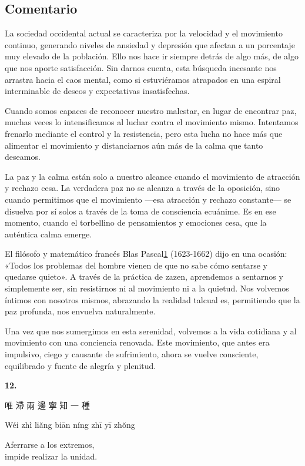 \documentclass[
  a5paperpaper,
]{article}
\begin{document}
\hfill\break

\hypertarget{comentario-10}{%
\subsection{Comentario}\label{comentario-10}}

La sociedad occidental actual se caracteriza por la velocidad y el
movimiento continuo, generando niveles de ansiedad y depresión que
afectan a un porcentaje muy elevado de la población. Ello nos hace ir
siempre detrás de algo más, de algo que nos aporte satisfacción. Sin
darnos cuenta, esta búsqueda incesante nos arrastra hacia el caos
mental, como si estuviéramos atrapados en una espiral interminable de
deseos y expectativas insatisfechas.

Cuando somos capaces de reconocer nuestro malestar, en lugar de
encontrar paz, muchas veces lo intensificamos al luchar contra el
movimiento mismo. Intentamos frenarlo mediante el control y la
resistencia, pero esta lucha no hace más que alimentar el movimiento y
distanciarnos aún más de la calma que tanto deseamos.

La paz y la calma están solo a nuestro alcance cuando el movimiento de
atracción y rechazo cesa. La verdadera paz no se alcanza a través de la
oposición, sino cuando permitimos que el movimiento ---esa atracción y
rechazo constante--- se disuelva por sí solos a través de la toma de
consciencia ecuánime. Es en ese momento, cuando el torbellino de
pensamientos y emociones cesa, que la auténtica calma emerge.

El filósofo y matemático francés Blas
Pascal\protect\hypertarget{ref1}{\protect\hyperlink{nota1}{1}}
(1623-1662) dijo en una ocasión: «Todos los problemas del hombre vienen
de que no sabe cómo sentarse y quedarse quieto». A través de la práctica
de zazen, aprendemos a sentarnos y simplemente ser, sin resistirnos ni
al movimiento ni a la quietud. Nos volvemos íntimos con nosotros mismos,
abrazando la realidad talcual es, permitiendo que la paz profunda, nos
envuelva naturalmente.

Una vez que nos sumergimos en esta serenidad, volvemos a la vida
cotidiana y al movimiento con una conciencia renovada. Este movimiento,
que antes era impulsivo, ciego y causante de sufrimiento, ahora se
vuelve consciente, equilibrado y fuente de alegría y plenitud.

\hfill\break

\hypertarget{02}{}
\begin{verseblock}

\newpage

\begin{center}\textbf{12.}\end{center}

唯 滯 兩 邊 寧 知 一 種

Wéi zhì liăng biān níng zhī yī zhŏng

Aferrarse a los extremos,\\
impide realizar la unidad.

\end{verseblock}
\end{document}
